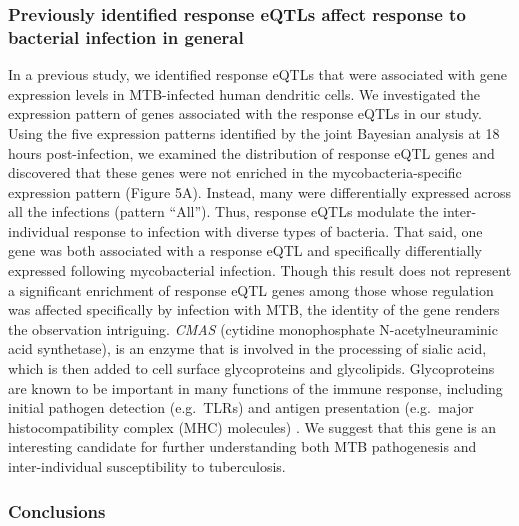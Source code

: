 \subsubsection{Previously identified response eQTLs affect response to
bacterial infection in
general}\label{previously-identified-response-eqtls-affect-response-to-bacterial-infection-in-general}

In a previous study, we identified response eQTLs that were associated
with gene expression levels in MTB-infected human dendritic cells. We
investigated the expression pattern of genes associated with the
response eQTLs in our study. Using the five expression patterns
identified by the joint Bayesian analysis at 18 hours post-infection, we
examined the distribution of response eQTL genes and discovered that
these genes were not enriched in the mycobacteria-specific expression
pattern (Figure 5A). Instead, many were differentially expressed across
all the infections (pattern ``All''). Thus, response eQTLs modulate the
inter-individual response to infection with diverse types of bacteria.
That said, one gene was both associated with a response eQTL and
specifically differentially expressed following mycobacterial infection.
Though this result does not represent a significant enrichment of
response eQTL genes among those whose regulation was affected
specifically by infection with MTB, the identity of the gene renders the
observation intriguing. \emph{CMAS} (cytidine monophosphate
N-acetylneuraminic acid synthetase), is an enzyme that is involved in
the processing of sialic acid, which is then added to cell surface
glycoproteins and glycolipids. Glycoproteins are known to be important
in many functions of the immune response, including initial pathogen
detection (e.g.~TLRs) and antigen presentation (e.g.~major
histocompatibility complex (MHC) molecules) \citep{Wolfert2013,
Johnson2013, Crespo2013}. We suggest that this gene is an
interesting candidate for further understanding both MTB pathogenesis
and inter-individual susceptibility to tuberculosis.

\subsubsection{Conclusions}\label{conclusions}

